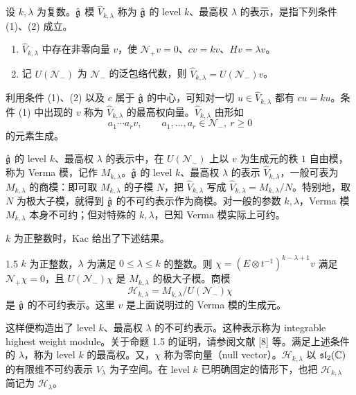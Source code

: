 设 $k,\lambda$ 为复数。$\hat{\mathfrak{g}}$ 模 $\hat{V}_{k,\lambda}$ 称为 $\hat{\mathfrak{g}}$ 的 level $k$、最高权 $\lambda$ 的表示，是指下列条件 (1)、(2) 成立。
\begin{enumerate}[label=(\arabic*),leftmargin=2.2em,itemsep=2pt]
  \item $\hat{V}_{k,\lambda}$ 中存在非零向量 $v$，使 $\mathcal{N}_+v=0$、$cv=kv$、$Hv=\lambda v$。
  \item 记 $U(\mathcal{N}_-)$ 为 $\mathcal{N}_-$ 的泛包络代数，则 $\hat{V}_{k,\lambda}=U(\mathcal{N}_-)v$。
\end{enumerate}
利用条件 (1)、(2) 以及 $c$ 属于 $\hat{\mathfrak{g}}$ 的中心，可知对一切 $u\in\hat{V}_{k,\lambda}$ 都有 $cu=ku$。条件 (1) 中出现的 $v$ 称为 $\hat{V}_{k,\lambda}$ 的最高权向量。$\hat{V}_{k,\lambda}$ 由形如
\[
  a_1\cdots a_rv,\qquad a_1,\dots,a_r\in\mathcal{N}_-,\ r\ge 0
\]
的元素生成。

$\hat{\mathfrak{g}}$ 的 level $k$、最高权 $\lambda$ 的表示中，在 $U(\mathcal{N}_-)$ 上以 $v$ 为生成元的秩 $1$ 自由模，称为 Verma 模，记作 $M_{k,\lambda}$。$\hat{\mathfrak{g}}$ 的 level $k$、最高权 $\lambda$ 的表示 $\hat{V}_{k,\lambda}$，一般可表为 $M_{k,\lambda}$ 的商模：即可取 $M_{k,\lambda}$ 的子模 $N$，把 $\hat{V}_{k,\lambda}$ 写成 $\hat{V}_{k,\lambda}=M_{k,\lambda}/N$。特别地，取 $N$ 为极大子模，就得到 $\hat{\mathfrak{g}}$ 的不可约表示作为商模。对一般的参数 $k,\lambda$，Verma 模 $M_{k,\lambda}$ 本身不可约；但对特殊的 $k,\lambda$，已知 Verma 模实际上可约。


$k$ 为正整数时，Kac 给出了下述结果。

\begin{proposition}{1.5}
$k$ 为正整数，$\lambda$ 为满足 $0\le\lambda\le k$ 的整数。则 $\chi=(E\otimes t^{-1})^{k-\lambda+1}v$ 满足 $\mathcal{N}_+\chi=0$，且 $U(\mathcal{N}_-)\chi$ 是 $M_{k,\lambda}$ 的极大子模。商模
\[
  \mathcal{H}_{k,\lambda}=M_{k,\lambda}/U(\mathcal{N}_-)\chi
\]
是 $\hat{\mathfrak{g}}$ 的不可约表示。这里 $v$ 是上面说明过的 Verma 模的生成元。
\end{proposition}

这样便构造出了 level $k$、最高权 $\lambda$ 的不可约表示。这种表示称为 integrable highest weight module。关于命题 1.5 的证明，请参阅文献 [8] 等。满足上述条件的 $\lambda$，称为 level $k$ 的最高权。又，$\chi$ 称为零向量（null vector）。$\mathcal{H}_{k,\lambda}$ 以 $\mathfrak{sl}_2(\mathbb{C})$ 的有限维不可约表示 $V_\lambda$ 为子空间。在 level $k$ 已明确固定的情形下，也把 $\mathcal{H}_{k,\lambda}$ 简记为 $\mathcal{H}_\lambda$。

